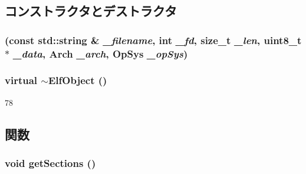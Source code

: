 \subsection{コンストラクタとデストラクタ}
\hypertarget{classElfObject_abc9df1f1dcb0d6c6f98d79fc0f53cb43}{
\subsubsection[{ElfObject}]{ (const std::string \& {\em \_\-filename}, \/  int {\em \_\-fd}, \/  size\_\-t {\em \_\-len}, \/  uint8\_\-t $\ast$ {\em \_\-data}, \/  {\bf Arch} {\em \_\-arch}, \/  {\bf OpSys} {\em \_\-opSys})}}
\label{classElfObject_abc9df1f1dcb0d6c6f98d79fc0f53cb43}
\hypertarget{classElfObject_a19af560ae64a3da113d7fac40f776232}{
\subsubsection[{$\sim$ElfObject}]{\setlength{\rightskip}{0pt plus 5cm}virtual $\sim${\bf ElfObject} ()}}
\label{classElfObject_a19af560ae64a3da113d7fac40f776232}



\begin{DoxyCode}
78 {}
\end{DoxyCode}


\subsection{関数}
\hypertarget{classElfObject_a7c222bfbc0dbfdb16cbdc408802ce451}{
\subsubsection[{getSections}]{\setlength{\rightskip}{0pt plus 5cm}void getSections ()}}
\label{classElfObject_a7c222bfbc0dbfdb16cbdc408802ce451}



